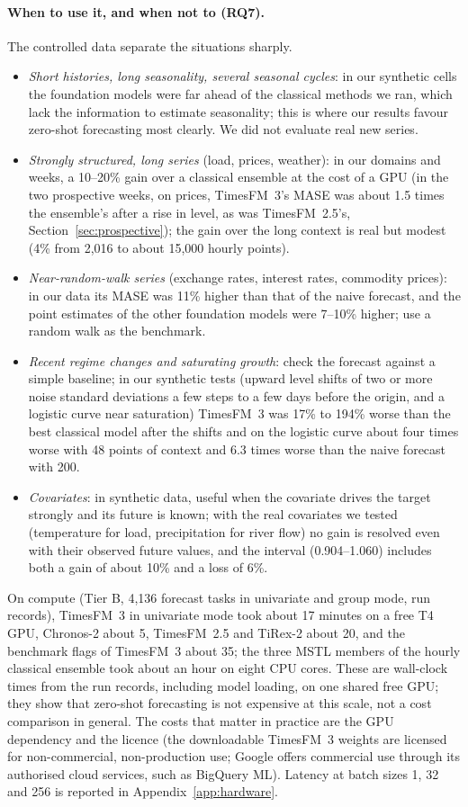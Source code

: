 \paragraph{When to use it, and when not to (RQ7).} The controlled data separate the situations sharply.
\begin{itemize}
\item \emph{Short histories, long seasonality, several seasonal cycles}: in our synthetic cells the foundation models were far
ahead of the classical methods we ran, which lack the information to estimate seasonality; this is where our results favour
zero-shot forecasting most clearly. We did not evaluate real new series.
\item \emph{Strongly structured, long series} (load, prices, weather): in our domains and weeks, a 10--20\% gain over a classical
ensemble at the cost of a GPU (in the two prospective weeks, on prices, TimesFM~3's MASE was about 1.5 times the ensemble's after a rise in level, as was
TimesFM~2.5's, Section~\ref{sec:prospective}); the gain over the long context is real but modest (4\% from 2{,}016 to about 15{,}000 hourly points).
\item \emph{Near-random-walk series} (exchange rates, interest rates, commodity prices): in our data its MASE was 11\% higher than that of the naive forecast, and the point estimates of the
other foundation models were 7--10\% higher; use a random walk as the benchmark.
\item \emph{Recent regime changes and saturating growth}: check the forecast against a simple baseline; in our synthetic tests
(upward level shifts of two or more noise standard deviations a few steps to a few days before the origin, and a logistic curve near
saturation) TimesFM~3 was 17\% to 194\% worse than the best classical model after the shifts and on the
logistic curve about four times worse with 48 points of context and 6.3 times worse than the naive forecast with 200.
\item \emph{Covariates}: in synthetic data, useful when the covariate drives the target strongly and its future is known; with the real
covariates we tested (temperature for load, precipitation for river flow) no gain is resolved even with their observed future values,
and the interval (0.904--1.060) includes both a gain of about 10\% and a loss of 6\%.
\end{itemize}
On compute (Tier B, 4{,}136 forecast tasks in univariate and group mode, run records), TimesFM~3 in univariate mode took about 17 minutes on a free T4 GPU,
Chronos-2 about 5, TimesFM~2.5 and TiRex-2 about 20, and the benchmark flags of TimesFM~3 about 35; the three MSTL members of the
hourly classical ensemble took about an hour on eight CPU cores. These are wall-clock times from the run records, including model
loading, on one shared free GPU; they show that zero-shot forecasting is not expensive at this scale, not a cost comparison in
general. The costs that matter in practice are the GPU dependency and the licence (the downloadable TimesFM~3 weights are licensed for non-commercial,
non-production use; Google offers commercial use through its authorised cloud services, such as BigQuery ML). Latency at batch sizes 1, 32 and 256 is reported in Appendix~\ref{app:hardware}.

